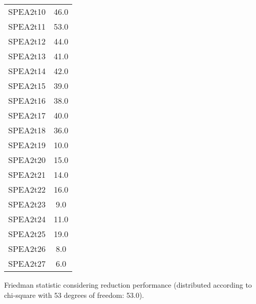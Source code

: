 \documentclass{article}
\begin{document}
\begin{table}[!htp]
\begin{tabular}{c|c}
SPEA2t10&46.0\\
SPEA2t11&53.0\\
SPEA2t12&44.0\\
SPEA2t13&41.0\\
SPEA2t14&42.0\\
SPEA2t15&39.0\\
SPEA2t16&38.0\\
SPEA2t17&40.0\\
SPEA2t18&36.0\\
SPEA2t19&10.0\\
SPEA2t20&15.0\\
SPEA2t21&14.0\\
SPEA2t22&16.0\\
SPEA2t23&9.0\\
SPEA2t24&11.0\\
SPEA2t25&19.0\\
SPEA2t26&8.0\\
SPEA2t27&6.0\\
\end{tabular}
\end{table}


Friedman statistic considering reduction performance (distributed according to chi-square with 53 degrees of freedom: 53.0).
\end{document}
